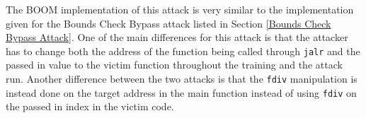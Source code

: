 The BOOM implementation of this attack is very similar to the implementation given for
the Bounds Check Bypass attack listed in Section \ref{Bounds Check Bypass Attack}. One of the main differences
for this attack is that the attacker has to change both the address of the function being called through
{\tt jalr} and the passed in value to the victim function throughout the training and the attack run.
Another difference between the two attacks is that the {\tt fdiv} manipulation is instead done on the target address
in the main function instead of using {\tt fdiv} on the passed in index in the victim code.
